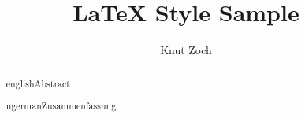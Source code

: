 \documentclass[font=minion,BCOR=4mm,%
               ngerman,english,%
               ]{ktxthss}
\author{Knut Zoch}
\title{LaTeX Style Sample}
\begin{document}

\frontmatter
\maketitle
\thispagestyle{empty}
\cleardoublepage

\begin{abstractpage}[1.0]
  \begin{abstract}{english}{Abstract}
    \Blindtext[2]
  \end{abstract}

  \begin{abstract}{ngerman}{Zusammenfassung}
    \Blindtext[1]
  \end{abstract}
\end{abstractpage}

\tableofcontents
\thispagestyle{plain}
\cleardoublepage

\mainmatter
\Blinddocument[5]
\end{document}
